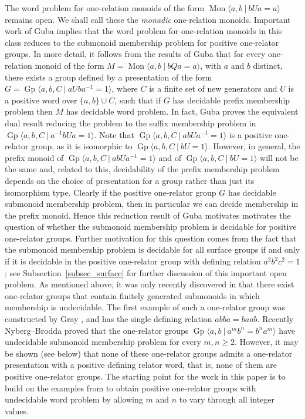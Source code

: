 \documentclass{amsart}
\newcommand{\Mpres}[2]{\operatorname{Mon}\bigl\langle #1\:|\:#2 \bigr\rangle}
\newcommand{\Gpres}[2]{\operatorname{Gp}\bigl\langle #1\:|\:#2 \bigr\rangle}
\theoremstyle{plain}
\theoremstyle{definition}
\begin{document}
The word problem for one-relation monoids of the form $\Mpres{a,b}{bUa=a}$ remains open. We shall call these the \emph{monadic} one-relation monoids. Important work of Guba \cite[Corollary~2.1]{Guba1997} implies that the word problem for one-relation monoids in this class reduces to the submonoid membership problem for positive one-relator groups.
In more detail, it follows from the results of Guba \cite{Guba1997} that for every one-relation monoid of the form $M = \Mpres{a,b}{bQa=a}$, with $a$ and $b$ distinct, there exists a group defined by a presentation of the form $G = \Gpres{a,b,C}{aUba^{-1}=1}$, where $C$ is a finite set of new generators and $U$ is a positive word over $\{a,b\} \cup C$, such that if $G$ has decidable prefix membership problem then $M$ has decidable word problem. In fact, Guba proves the equivalent dual result reducing the problem to the suffix membership problem in $\Gpres{a,b,C}{a^{-1}bUa=1}$.
Note that $\Gpres{a,b,C}{abUa^{-1}=1}$ is a positive one-relator group, as it is isomorphic to $\Gpres{a,b,C}{bU=1}$. However, in general, the prefix monoid of $\Gpres{a,b,C}{abUa^{-1}=1}$ and of $\Gpres{a,b,C}{bU=1}$ will not be the same and, related to this, decidability of the prefix membership problem depends on the choice of presentation for a group rather than just its isomorphism type.
Clearly if the positive one-relator group $G$ has decidable submonoid membership problem, then in particular we can decide membership in the prefix monoid. Hence this reduction result of Guba motivates motivates the question of whether the submonoid membership problem is decidable for positive one-relator groups. 
Further motivation for this question comes from the fact that the submonoid membership problem is decidable for all surface groups if and only if it is decidable in the positive one-relator group with defining relation $a^2b^2c^2=1$; see Subsection~\ref{subsec_surface} for further discussion of this important open problem.  
As mentioned above, it was only recently discovered in \cite{gray2020undecidability} that there exist one-relator groups that contain finitely generated submonoids in which membership is undecidable. The first example of such a one-relator group was constructed by Gray \cite{gray2020undecidability}, and has the single defining relation $abba = baab$. Recently Nyberg--Brodda \cite{nyberg2022diophantine} proved that the one-relator groups $\Gpres{a,b}{a^mb^n = b^na^m}$ have undecidable submonoid membership problem for every $m, n \geq 2$. 
However, it may be shown (see below) that none of these one-relator groups admits a one-relator presentation with a positive defining relator word, that is, none of them are positive one-relator groups. The starting point for the work in this paper is to build on the examples from \cite{nyberg2022diophantine} to obtain positive one-relator groups with undecidable word problem by allowing $m$ and $n$ to vary through all integer values. 
\end{document}
